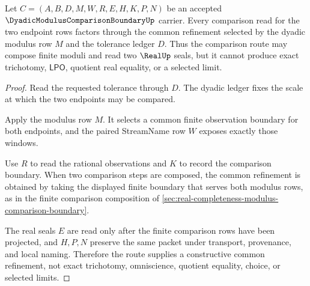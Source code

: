 \begin{theorem}
\label{thm:dyadic-modulus-comparison-boundary-common-refinement}
Let $C=(A,B,D,M,W,R,E,H,K,P,N)$ be an accepted $\DyadicModulusComparisonBoundaryUp$ carrier. Every comparison read for the two endpoint rows factors through the common refinement selected by the dyadic modulus row $M$ and the tolerance ledger $D$. Thus the comparison route may compose finite moduli and read two $\RealUp$ seals, but it cannot produce exact trichotomy, $\mathsf{LPO}$, quotient real equality, or a selected limit.
\end{theorem}
\begin{proof}
Read the requested tolerance through $D$. The dyadic ledger fixes the scale at which the two endpoints may be compared.

Apply the modulus row $M$. It selects a common finite observation boundary for both endpoints, and the paired StreamName row $W$ exposes exactly those windows.

Use $R$ to read the rational observations and $K$ to record the comparison boundary. When two comparison steps are composed, the common refinement is obtained by taking the displayed finite boundary that serves both modulus rows, as in the finite comparison composition of \autoref{sec:real-completeness-modulus-comparison-boundary}.

The real seals $E$ are read only after the finite comparison rows have been projected, and $H,P,N$ preserve the same packet under transport, provenance, and local naming. Therefore the route supplies a constructive common refinement, not exact trichotomy, omniscience, quotient equality, choice, or selected limits.
\end{proof}



